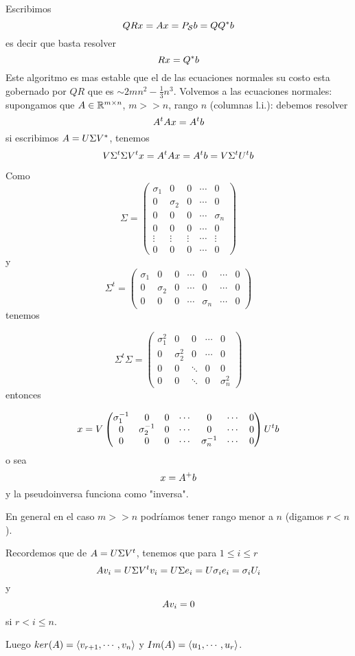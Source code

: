 Escribimos  
$$
\Qb\Rb\xb=\Ab\xb=P_{\mathcal{S}}\bb=\Qb\Qb^*\bb
$$
es decir que basta resolver
$$
\Rb\xb=\Qb^*\bb
$$
Este algoritmo es mas estable que el de las ecuaciones normales su costo esta gobernado por $QR$  que es 
$\sim 2mn^2-\frac13n^3$.
Volvemos a las ecuaciones normales: supongamos que $\Ab\in \R^{m\times n}$, $m>>n$, rango $n$  (columnas l.i.): debemos resolver
$$
\Ab^t\Ab\xb=\Ab^t\bb
$$
si escribimos $\Ab=\Ub\Sigma\Vb^*$, tenemos
$$
\Vb\Sigma^t\Sigma\Vb^t\xb=\Ab^t\Ab\xb=\Ab^t\bb=\Vb\Sigma^t\Ub^t\bb
$$

Como 
$$\Sigma=
\begin{pmatrix}
\sigma_1&0&0&\cdots &0\\
0&\sigma_2&0&\cdots &0\\
0&0&0&\cdots&\sigma_n\\
0&0&0&\cdots&0\\
\vdots&\vdots&\vdots&\cdots&\vdots\\
0&0&0&\cdots&0
\end{pmatrix}
$$
y
$$\Sigma^t=
\begin{pmatrix}
\sigma_1&0&0&\cdots &0&\cdots&0\\
0&\sigma_2&0&\cdots &0&\cdots&0\\
0&0&0&\cdots&\sigma_n&\cdots&0
\end{pmatrix}
$$
tenemos

$$
\Sigma^t\Sigma=
\begin{pmatrix}
\sigma_1^2&0&0&\cdots &0\\
0&\sigma_2^2&0&\cdots &0\\
0&0&\ddots&0&0\\
0&0&\ddots&0&\sigma_n^2
\end{pmatrix}
$$
entonces

$$
\xb=
\Vb
\begin{pmatrix}
\sigma_1^{-1}&0&0&\cdots &0&\cdots&0\\
0&\sigma_2^{-1}&0&\cdots &0&\cdots&0\\
0&0&0&\cdots&\sigma_n^{-1}&\cdots&0
\end{pmatrix}
\Ub^t\bb
$$
o sea
$$
\xb=
\Ab^+\bb
$$
y la pseudoinversa funciona como "inversa".

En general en el caso $m>>n$ podríamos tener rango menor a $n$ (digamos $r<n$).

Recordemos que de $\Ab=\Ub\Sigma\Vb^t$, tenemos que para $1\le i\le r$
$$
\Ab\vb_i=\Ub\Sigma\Vb^t\vb_i=\Ub\Sigma\eb_i=\Ub\sigma_i\eb_i=\sigma_i\Ub_i
$$
y 
$$
\Ab\vb_i=\cero
$$
si $r<i\le n$. 


Luego $ker(\Ab)=\langle \vb_{r+1},\cdots,\vb_n\rangle $ y
$Im(\Ab)=\langle \ub_1,\cdots,\ub_r\rangle$.

